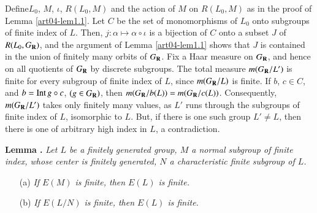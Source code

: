 Define\pageoriginale $L_{0}$, $M$, $\iota$, $R(L_{0},M)$ and the action of $M$ on $R(L_{0},M)$ as in the proof of Lemma \ref{art04-lem1.1}. Let $C$ be the set of monomorphisms of $L_{0}$ onto subgroups of finite index of $L$. Then, $j:\alpha\mapsto \alpha\circ \iota$ is a bijection of $C$ onto a subset $J$ of $R(L_{0},G_{\mathbf{R}})$, and the argument of Lemma \ref{art04-lem1.1} shows that $J$ is contained in the union of finitely many orbits of $G_{\mathbf{R}}$. Fix a Haar measure on $G_{\mathbf{R}}$, and hence on all quotients of $G_{\mathbf{R}}$ by discrete subgroups. The total measure $m(G_{\mathbf{R}}/L')$ is finite for every subgroup of finite index of $L$, since $m(G_{\mathbf{R}}/L)$ is finite. If $b$, $c\in C$, and $b=\operatorname{\mathrm{Int}} g\circ c$, $(g\in G_{\mathbf{R}})$, then $m(G_{\mathbf{R}}/b(L))=m(G_{\mathbf{R}}/c(L))$. Consequently, $m(G_{\mathbf{R}}/L')$ takes only finitely many values, as $L'$ runs through the subgroups of finite index of $L$, isomorphic to $L$. But, if there is one such group $L'\neq L$, then there is one of arbitrary high index in $L$, a contradiction.

\medskip
\noindent
{\bf Lemma .\label{art04-lem1.4}}
{\em Let $L$ be a finitely generated group, $M$ a normal subgroup of finite index, whose center is finitely generated, $N$ a characteristic finite subgroup of $L$.}
\begin{itemize}
\item[{\rm(a)}] {\em If $E(M)$ is finite, then $E(L)$ is finite.}

\item[{\rm(b)}] {\em If $E(L/N)$ is finite, then $E(L)$ is finite.}
\end{itemize}

